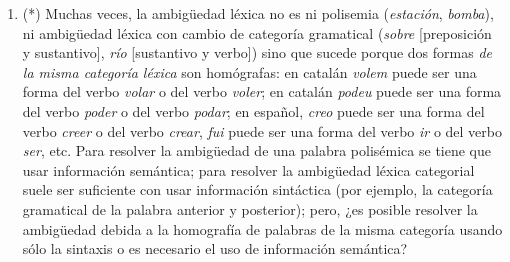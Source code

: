 \begin{enumerate}
\item (*) Muchas veces, la ambigüedad léxica no es ni polisemia (\emph{estación}, \emph{bomba}), ni ambigüedad léxica con cambio de categoría gramatical (\emph{sobre} [preposición y sustantivo], \emph{río} [sustantivo y verbo]) sino que sucede porque dos formas \emph{de la misma categoría léxica} son homógrafas: en catalán \emph{volem} puede ser una forma del verbo \emph{volar} o del verbo \emph{voler}; en catalán \emph{podeu} puede ser una forma del verbo \emph{poder} o del verbo \emph{podar}; en español, \emph{creo} puede ser una forma del verbo \emph{creer} o del verbo \emph{crear}, \emph{fui} puede ser una forma del verbo \emph{ir} o del verbo \emph{ser}, etc. Para resolver la ambigüedad de una palabra polisémica se tiene que usar información semántica; para resolver la ambigüedad léxica categorial suele ser suficiente con usar información sintáctica (por ejemplo, la categoría gramatical de la palabra anterior y posterior); pero, ¿es posible resolver la ambigüedad debida a la homografía de palabras de la misma categoría usando sólo la sintaxis o es necesario el uso de información semántica? 


\end{enumerate}

